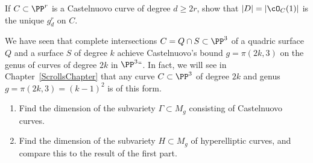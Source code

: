 \begin{exercise}\label{castelnuovo unique}
If $C \subset \PP^r$ is a
Castelnuovo curve
%
of degree $d \geq 2r$,
show that $|D| = |\cO_C(1)|$ is the unique $g^r_d$ on $C$.
\end{exercise}

\begin{exercise}\label{rarity of Castelnuovo}
We have seen that complete intersections $C = Q \cap S \subset \PP^3$ of a
quadric surface $Q$ and a surface $S$ of degree $k$ achieve Castelnuovo's
bound $g = \pi(2k, 3)$ on the genus of curves of degree $2k$ in $\PP^3``$.
In fact, we will see in Chapter~\ref{ScrollsChapter} that any curve
$C \subset \PP^3$ of degree $2k$ and genus $g = \pi(2k, 3) = (k-1)^2$
is of this form.
\begin{enumerate}
\item Find the dimension of the subvariety $\Gamma \subset M_g$ consisting
of Castelnuovo curves.
\item Find the dimension of the subvariety $H \subset M_g$ of
hyperelliptic curves, and compare this to the result of the first part.
\end{enumerate}\label{tnih10.8}
\end{exercise}
\endgroup %


